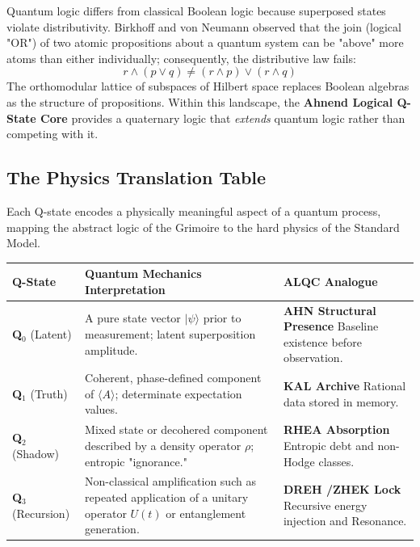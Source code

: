 \documentclass[11pt, letterpaper]{article}
\newcommand{\KAL}{\ensuremath{\mathop{\textnormal{\symbolafont\symbol{"2B21}}}}}    %
\newcommand{\AHN}{\ensuremath{\mathop{\textnormal{\symbolafont\symbol{"269D}}}}}    %
\newcommand{\DREH}{\ensuremath{\mathop{\textnormal{\symbolafont\symbol{"29D7}}}}}   %
\newcommand{\RHEA}{\ensuremath{\mathop{\textnormal{\symbolafont\symbol{"229B}}}}}   %
\newcommand{\ZHEK}{\ensuremath{\mathop{\textnormal{\symbolafont\symbol{"2744}}}}}   %
\def\KAL{KAL}%
\def\AHN{AHN}%
\def\DREH{DREH}%
\def\RHEA{RHEA}%
\def\ZHEK{ZHEK}%
\begin{document}
Quantum logic differs from classical Boolean logic because superposed states violate distributivity. Birkhoff and von Neumann observed that the join (logical "OR") of two atomic propositions about a quantum system can be "above" more atoms than either individually; consequently, the distributive law fails:
\[
r \land (p \lor q) \neq (r \land p) \lor (r \land q)
\]
The orthomodular lattice of subspaces of Hilbert space replaces Boolean algebras as the structure of propositions. Within this landscape, the \textbf{Ahnend Logical Q-State Core} provides a quaternary logic that \textit{extends} quantum logic rather than competing with it.

\subsection{The Physics Translation Table}\label{appendixK.3}

Each Q-state encodes a physically meaningful aspect of a quantum process, mapping the abstract logic of the Grimoire to the hard physics of the Standard Model.

\begin{center}
\begin{longtable}{p{2.5cm} p{5.5cm} p{5.5cm}}
\toprule
\textbf{Q-State} & \textbf{Quantum Mechanics Interpretation} & \textbf{ALQC Analogue} \\
\midrule
\endhead

\textbf{Q$_0$} \newline (Latent) & A pure state vector $|\psi\rangle$ prior to measurement; latent superposition amplitude. & \textbf{\AHN{} Structural Presence} \newline Baseline existence before observation. \\
\addlinespace[1ex]

\textbf{Q$_1$} \newline (Truth) & Coherent, phase-defined component of $\langle A \rangle$; determinate expectation values. & \textbf{\KAL{} Archive} \newline Rational data stored in memory. \\
\addlinespace[1ex]

\textbf{Q$_2$} \newline (Shadow) & Mixed state or decohered component described by a density operator $\rho$; entropic "ignorance." & \textbf{\RHEA{} Absorption} \newline Entropic debt and non-Hodge classes. \\
\addlinespace[1ex]

\textbf{Q$_3$} \newline (Recursion) & Non-classical amplification such as repeated application of a unitary operator $U(t)$ or entanglement generation. & \textbf{\DREH{} \slash  \ZHEK{} Lock} \newline Recursive energy injection and Resonance. \\

\bottomrule
\end{longtable}
\end{center}
\end{document}
